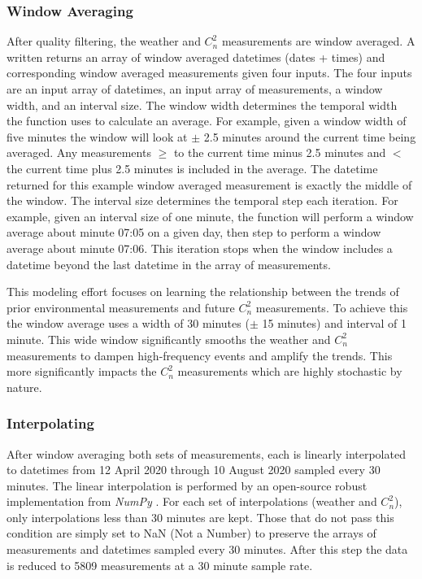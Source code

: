 \subsubsection{Window Averaging}
After quality filtering, the weather and $C_{n}^{2}$ measurements are window averaged. A written returns an array of window averaged datetimes (dates + times) and corresponding window averaged measurements given four inputs. The four inputs are an input array of datetimes, an input array of measurements, a window width, and an interval size. The window width determines the temporal width the function uses to calculate an average. For example, given a window width of five minutes the window will look at $\pm$ 2.5 minutes around the current time being averaged. Any measurements $\ge$ to the current time minus 2.5 minutes and $<$ the current time plus 2.5 minutes is included in the average. The datetime returned for this example window averaged measurement is exactly the middle of the window. The interval size determines the temporal step each iteration. For example, given an interval size of one minute, the function will perform a window average about minute 07:05 on a given day, then step to perform a window average about minute 07:06. This iteration stops when the window includes a datetime beyond the last datetime in the array of measurements.

This modeling effort focuses on learning the relationship between the trends of prior environmental measurements and future $C_{n}^{2}$ measurements. To achieve this the window average uses a width of 30 minutes ($\pm$ 15 minutes) and interval of 1 minute. This wide window significantly smooths the weather and $C_{n}^{2}$ measurements to dampen high-frequency events and amplify the trends. This more significantly impacts the $C_{n}^{2}$ measurements which are highly stochastic by nature. 

\subsubsection{Interpolating}
After window averaging both sets of measurements, each is linearly interpolated to datetimes from 12 April 2020 through 10 August 2020 sampled every 30 minutes. The linear interpolation is performed by an open-source robust implementation from \textit{NumPy} \cite{harris2020array}. For each set of interpolations (weather and $C_{n}^{2}$), only interpolations less than 30 minutes are kept. Those that do not pass this condition are simply set to NaN (Not a Number) to preserve the arrays of measurements and datetimes sampled every 30 minutes. After this step the data is reduced to 5809 measurements at a 30 minute sample rate.


